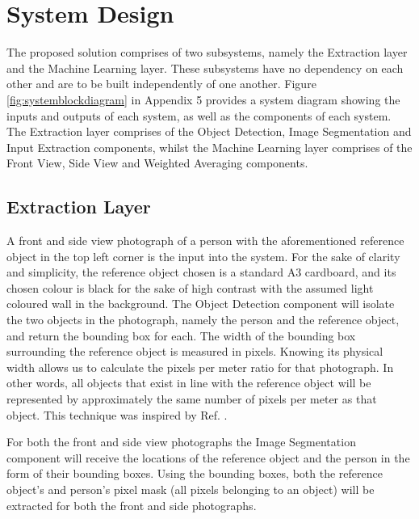 \documentclass[conference]{IEEEtran}
\begin{document}
\section{System Design}
The proposed solution comprises of two subsystems, namely the Extraction layer and the Machine Learning layer.
These subsystems have no dependency on each other and are to be built independently of one another.
Figure \ref{fig:systemblockdiagram} in Appendix 5 provides a system diagram showing the inputs and outputs of each system, as well as the components of each system.
The Extraction layer comprises of the Object Detection, Image Segmentation and Input Extraction components, whilst the Machine Learning layer comprises of the Front View, Side View and Weighted Averaging components.
\subsection{Extraction Layer}
A front and side view photograph of a person with the aforementioned reference object in the top left corner is the input into the system.
For the sake of clarity and simplicity, the reference object chosen is a standard A3 cardboard, and its chosen colour is black for the sake of high contrast with the assumed light coloured wall in the background.
The Object Detection component will isolate the two objects in the photograph, namely the person and the reference object, and return the bounding box for each.
The width of the bounding box surrounding the reference object is measured in pixels.
Knowing its physical width allows us to calculate the pixels per meter ratio for that photograph.
In other words, all objects that exist in line with the reference object will be represented by approximately the same number of pixels per meter as that object.
This technique was inspired by Ref. \cite{objectDetection}.

For both the front and side view photographs the Image Segmentation component will receive the locations of the reference object and the person in the form of their bounding boxes.
Using the bounding boxes, both the reference object's and person's pixel mask (all pixels belonging to an object) will be extracted for both the front and side photographs.
\end{document}
